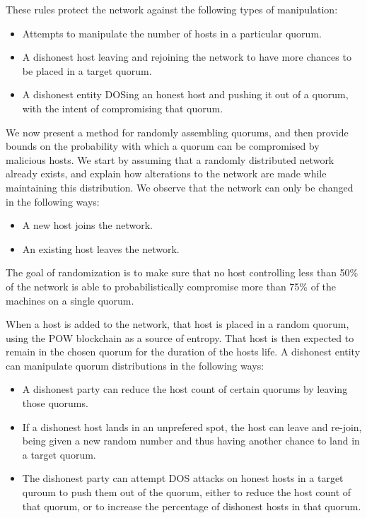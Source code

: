 \documentclass[twocolumn]{article}
\begin{document}
These rules protect the network against the following types of manipulation:
\begin{itemize}
	\item Attempts to manipulate the number of hosts in a particular quorum.
	\item A dishonest host leaving and rejoining the network to have more chances to be placed in a target quorum.
	\item A dishonest entity DOSing an honest host and pushing it out of a quorum, with the intent of compromising that quorum.
\end{itemize}




We now present a method for randomly assembling quorums, and then provide bounds on the probability with which a quorum can be compromised by malicious hosts.
We start by assuming that a randomly distributed network already exists, and explain how alterations to the network are made while maintaining this distribution.
We observe that the network can only be changed in the following ways:
\begin{itemize}
	\item A new host joins the network.
	\item An existing host leaves the network.
\end{itemize}

The goal of randomization is to make sure that no host controlling less than 50\% of the network is able to probabilistically compromise more than 75\% of the machines on a single quorum.

When a host is added to the network, that host is placed in a random quorum, using the POW blockchain as a source of entropy.
That host is then expected to remain in the chosen quorum for the duration of the hosts life.
A dishonest entity can manipulate quorum distributions in the following ways:
\begin{itemize}
	\item A dishonest party can reduce the host count of certain quorums by leaving those quorums.
	\item If a dishonest host lands in an unprefered spot, the host can leave and re-join, being given a new random number and thus having another chance to land in a target quorum.
	\item The dishonest party can attempt DOS attacks on honest hosts in a target quroum to push them out of the quorum, either to reduce the host count of that quorum, or to increase the percentage of dishonest hosts in that quorum.
\end{itemize}
\end{document}
